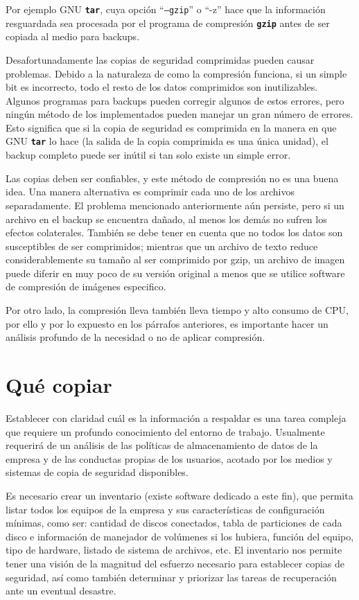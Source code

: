 \documentclass[12pt]{article}
\begin{document}
Por ejemplo GNU \texttt{\textbf{tar}}, cuya opción ``{\tt --gzip}'' o 
``{-z}'' hace que la información resguardada sea procesada por el programa 
de compresión \texttt{\textbf{gzip}} antes de ser copiada al medio para 
backups.
	
Desafortunadamente las copias de seguridad comprimidas pueden causar 
problemas. Debido a la naturaleza de como la compresión funciona, si un 
simple bit es incorrecto, todo el resto de los datos comprimidos son 
inutilizables. Algunos programas para backups pueden corregir algunos de 
estos errores, pero ningún método de los implementados 
pueden manejar un gran número de errores. Esto significa que si la copia de 
seguridad es comprimida en la manera en que GNU \texttt{\textbf{tar}} lo 
hace (la salida de la copia comprimida es una única unidad), el backup 
completo puede ser inútil si tan solo existe un simple error.

Las copias deben ser confiables, y este método de compresión no es una 
buena idea. Una manera alternativa es comprimir cada uno de los archivos 
separadamente. El problema mencionado anteriormente aún persiste, pero si 
un archivo en el backup se encuentra dañado, al menos los demás no sufren 
los efectos colaterales. También se debe tener en cuenta que no todos los 
datos son susceptibles de ser comprimidos; mientras que un archivo de 
texto reduce considerablemente su tamaño al ser comprimido por gzip, un
archivo de imagen puede diferir en muy poco de su versión original a menos
que se utilice software de compresión de imágenes especifico. 

Por otro lado, la compresión lleva también lleva tiempo y alto consumo 
de CPU, por ello y por lo expuesto en los párrafos anteriores, es importante
hacer un análisis profundo de la necesidad o no de aplicar compresión.
	
\section*{Qué copiar}

Establecer con claridad cuál es la información a respaldar es una tarea 
compleja que requiere un profundo conocimiento del entorno de trabajo. 
Usualmente requerirá de un análisis de las políticas de almacenamiento 
de datos de la empresa y de las conductas propias de los usuarios, acotado
por los medios y sistemas de copia de seguridad disponibles.  

Es necesario crear un inventario (existe software dedicado a este fin), que
permita listar todos los equipos de la empresa y sus características de 
configuración mínimas, como ser: cantidad de discos conectados, tabla de
particiones de cada disco e información de manejador de volúmenes si los 
hubiera, función del equipo, tipo de hardware, listado de sistema de 
archivos, etc. El inventario nos permite tener una visión de la magnitud
del esfuerzo necesario para establecer copias de seguridad, así como 
también determinar y priorizar las tareas de recuperación ante un eventual
desastre. 
\end{document}
